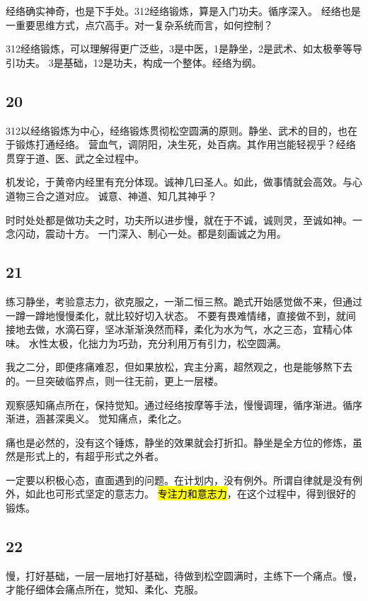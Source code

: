 经络确实神奇，也是下手处。312经络锻炼，算是入门功夫。循序深入。
经络也是一重要思维方式，点穴高手。对一复杂系统而言，如何控制？

312经络锻炼，可以理解得更广泛些，3是中医，1是静坐，2是武术、如太极拳等导引功夫。
3是基础，12是功夫，构成一个整体。经络为纲。

\subsection{20}

312以经络锻炼为中心，经络锻炼贯彻松空圆满的原则。静坐、武术的目的，也在于锻炼打通经络。
营血气，调阴阳，决生死，处百病。其作用岂能轻视乎？经络贯穿于道、医、武之全过程中。

机发论，于黄帝内经里有充分体现。诚神几曰圣人。如此，做事情就会高效。与心道物三合之道对应。
诚意、神道、知几其神乎？

时时处处都是做功夫之时，功夫所以进步慢，就在于不诚，诚则灵，至诚如神。一念闪动，震动十方。
一门深入、制心一处。都是刻画诚之为用。

\subsection{21}

练习静坐，考验意志力，欲克服之，一渐二恒三熬。跪式开始感觉做不来，但通过一蹲一蹲地慢慢柔化，就比较好切入状态。
不要有畏难情绪，直接做不到，就间接地去做，水滴石穿，坚冰渐渐涣然而释，柔化为水为气，水之三态，宜精心体味。
水性太极，化拙力为巧劲，充分利用万有引力，松空圆满。

我之二分，即便疼痛难忍，但如果放松，宾主分离，超然观之，也是能够熬下去的。一旦突破临界点，则一往无前，更上一层楼。

观察感知痛点所在，保持觉知。通过经络按摩等手法，慢慢调理，循序渐进。循序渐进，涵甚深奥义。
觉知痛点，柔化之。

痛也是必然的，没有这个锤炼，静坐的效果就会打折扣。静坐是全方位的修炼，虽然是形式上的，有超乎形式之外者。

一定要以积极心态，直面遇到的问题。在计划内，没有例外。所谓自律就是没有例外，如此也可形式坚定的意志力。
\hl{专注力和意志力}，在这个过程中，得到很好的锻炼。

\subsection{22}

慢，打好基础，一层一层地打好基础，待做到松空圆满时，主练下一个痛点。慢，才能仔细体会痛点所在，觉知、柔化、克服。

